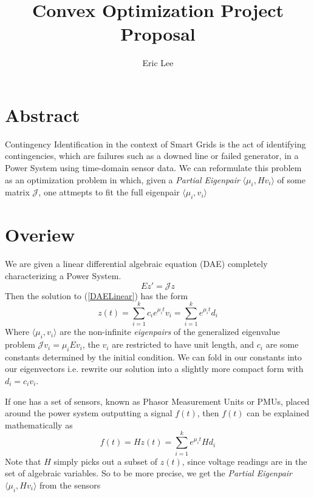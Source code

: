 

\title{Convex Optimization Project Proposal}
\author{Eric Lee }
\date{}


\maketitle

\section{Abstract}
Contingency Identification in the context of Smart Grids is the act of identifying contingencies, which are failures such as a downed line or failed generator, in a Power System using time-domain sensor data. We can reformulate this problem as an optimization problem in which, given a \textit{Partial Eigenpair} $\langle \mu_i,Hv_i \rangle$ of some matrix $\mathcal{J}$, one attmepts to fit the full eigenpair $\langle \mu_i,v_i \rangle$
\section{Overiew}
We are given a linear differential algebraic equation (DAE) completely characterizing a Power System. 
\begin{equation} \label{DAELinear}
Ez' = \mathcal{J} z
\end{equation}
Then the solution to (\ref{DAELinear}) has the form
\begin{equation}\label{DAESolution}
z(t) = \sum_{i = 1}^{k} c_i e^{\mu_it}v_i = \sum_{i = 1}^{k} e^{\mu_it}d_i
\end{equation}
Where $\langle \mu_i,v_i \rangle$ are the non-infinite \textit{eigenpairs} of the generalized eigenvalue problem $\mathcal{J} v_i = \mu_i Ev_i $, the $v_i$ are restricted to have unit length, and $c_i$ are some constants determined by the initial condition. We can fold in our constants into our eigenvectors i.e. rewrite our solution into a slightly more compact form with $d_i = c_i v_i$. 

If one has a set of sensors, known as Phasor Measurement Units or PMUs, placed around the power system outputting a signal $f(t)$, then $f(t)$ can be explained mathematically as 
\begin{equation}\label{PMUSolution}
f(t) = Hz(t) = \sum_{i = 1}^{k} e^{\mu_it}Hd_i
\end{equation}
Note that $H$ simply picks out a subset of $z(t)$, since voltage readings are in the set of algebraic variables. So to be more precise, we get the \textit{Partial Eigenpair}
$\langle \mu_i,Hv_i \rangle$ from the sensors


